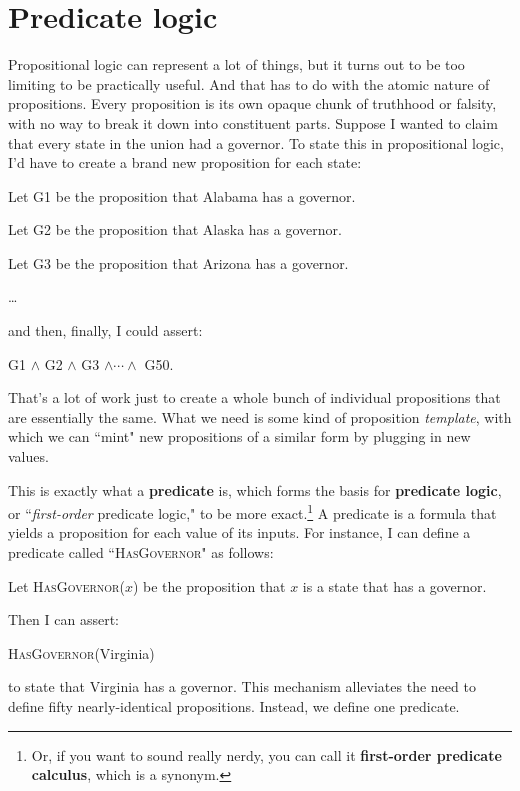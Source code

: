 \section{Predicate logic}

Propositional logic can represent a lot of things, but it turns out to be
too limiting to be practically useful. And that has to do with the atomic
nature of propositions. Every proposition is its own opaque chunk of
truthhood or falsity, with no way to break it down into constituent parts.
Suppose I wanted to claim that every state in the union had a governor. To
state this in propositional logic, I'd have to create a brand new
proposition for each state:

\quad\quad Let G1 be the proposition that Alabama has a governor.

\quad\quad Let G2 be the proposition that Alaska has a governor.

\quad\quad Let G3 be the proposition that Arizona has a governor.

\quad\quad \dots

and then, finally, I could assert:
\begin{center}
G1 $\wedge$ G2 $\wedge$ G3 $\wedge \cdots \wedge$ G50.
\end{center}

That's a lot of work just to create a whole bunch of individual
propositions that are essentially the same. What we need is some kind of 
proposition \textit{template}, with which we can ``mint" new propositions
of a similar form by plugging in new values.

This is exactly what a \textbf{predicate} is, which forms the basis for
\textbf{predicate logic}, or ``\textit{first-order} predicate logic," to be
more exact.\footnote{Or, if you want to sound really nerdy, you can call it
\textbf{first-order predicate calculus}, which is a synonym.} A predicate
is a formula that yields a proposition for each value of its inputs. For
instance, I can define a predicate called ``\textsc{HasGovernor}" as
follows:
\begin{center}
Let \textsc{HasGovernor}($x$) be the proposition that $x$ is a state that
has a governor.
\end{center}
Then I can assert:
\begin{center}
\textsc{HasGovernor}(Virginia)
\end{center}
to state that Virginia has a governor. This mechanism alleviates the need
to define fifty nearly-identical propositions. Instead, we define one
predicate.

